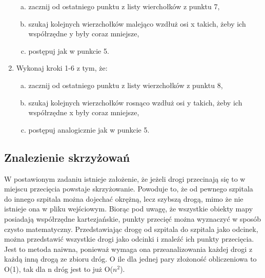 \documentclass[10pt,a4paper]{article}
\begin{document}
\begin{enumerate}
\begin{enumerate}[a)]
        \item zacznij od ostatniego punktu z listy wierchołków z punktu 7,
        \item szukaj kolejnych wierzchołków malejąco wzdłuż osi x takich, żeby ich współrzędne y były coraz mniejsze,
        \item postępuj jak w punkcie 5.
    \end{enumerate}
    \item Wykonaj kroki 1-6 z tym, że:
    \begin{enumerate}[a)]
        \item zacznij od ostatniego punktu z listy wierzchołków z punktu 8,
        \item szukaj kolejnych wierzchołków rosnąco wzdłuż osi y takich, żeby ich współrzędne x były coraz mniejsze,
        \item postępuj analogicznie jak w punkcie 5.
    \end{enumerate}
\end{enumerate}

\subsection{Znalezienie skrzyżowań}

W postawionym zadaniu istnieje założenie, że jeżeli drogi przecinają się to w miejscu przecięcia powstaje skrzyżowanie.
Powoduje to, że od pewnego szpitala do innego szpitala można dojechać okrężną, lecz szybszą drogą, mimo że nie istnieje ona w pliku wejściowym.
Biorąc pod uwagę, że wszystkie obiekty mapy posiadają współrzędne kartezjańskie, punkty przecięć można wyznaczyć w sposób czysto matematyczny.
Przedstawiając drogę od szpitala do szpitala jako odcinek, można przedstawić wszystkie drogi jako odcinki i znaleźć ich punkty przecięcia.
Jest to metoda naiwna, ponieważ wymaga ona przeanalizowania każdej drogi z każdą inną drogą ze zbioru dróg.
O ile dla jednej pary złożoność obliczeniowa to O(1), tak dla n dróg jest to już O($n^2$).
\end{document}
